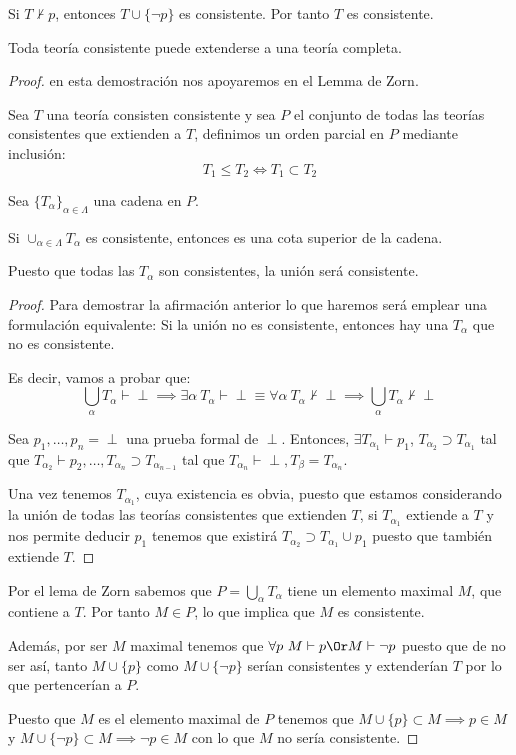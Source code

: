 \documentclass{apuntes}
\begin{document}
\begin{theorem}
	Si $T \nvdash p$, entonces $T\cup \{\neg p\}$ es consistente. Por tanto $T$ es consistente.
	\label{thm:pconsnegp}
\end{theorem}

\begin{theorem}
	Toda teoría consistente puede extenderse a una teoría completa.
	\label{thm:lindenbaum}
\end{theorem}
\begin{proof}
	en esta demostración nos apoyaremos en el Lemma de Zorn. 

	Sea $T$ una teoría consisten consistente y sea $P$ el conjunto de todas las teorías consistentes que extienden a $T$, definimos un orden parcial en $P$ mediante inclusión:
	\[T_1\le T_2 \iff T_1\subset T_2\]

	Sea $\{T_\alpha\}_{\alpha\in\Lambda}$ una cadena en $P$.

	Si $\cup_{\alpha\in\Lambda} T_\alpha$ es consistente, entonces es una cota superior de la cadena. 

	Puesto que todas las $T_\alpha$ son consistentes, la unión será consistente.
	\begin{proof}
	Para demostrar la afirmación anterior lo que haremos será emplear una formulación equivalente: Si la unión no es consistente, entonces hay una $T_α$ que no es consistente.

	Es decir, vamos a probar que:
	\[\bigcup_α T_α \vdash \perp \implies \exists α \ T_α \vdash \perp \equiv \forall α \ T_α \nvdash \perp \implies \bigcup_αT_α \nvdash \perp\]

	Sea $p_1,\hdots,p_n = \perp$ una prueba formal de $\perp$. Entonces, $\exists T_{\alpha_1}\vdash p_1$, $T_{\alpha_2} \supset T_{\alpha_1}$ tal que $T_{\alpha_2}\vdash p_2, \hdots, T_{\alpha_n}\supset T_{\alpha_{n-1}}$ tal que $T_{\alpha_n}\vdash \perp, T_\beta = T_{\alpha_n}$.

	\obs Una vez tenemos $T_{α_1}$, cuya existencia es obvia, puesto que estamos considerando la unión de todas las teorías consistentes que extienden $T$, si $T_{α_1}$ extiende a $T$ y nos permite deducir $p_1$ tenemos que existirá $T_{α_2} \supset T_{α_1} \cup p_1$ puesto que también extiende $T$.
	\end{proof}

	Por el lema de Zorn sabemos que $P=\bigcup_αT_α$ tiene un elemento maximal $M$, que contiene a $T$. Por tanto $M\in P$, lo que implica que $M$ es consistente.

	Además, por ser $M$ maximal tenemos que $\forall p \ M \vdash p \Or M \vdash \neg p$ puesto que de no ser así, tanto $M\cup\{p\}$ como $M\cup\{\neg p\}$ serían consistentes y extenderían $T$ por lo que pertencerían a $P$. 

	Puesto que $M$ es el elemento maximal de $P$ tenemos que $M\cup\{p\} \subset M \implies p \in M$ y $M\cup\{\neg p\}\subset M \implies \neg p \in M$ con lo que $M$ no sería consistente.
\end{proof}
\end{document}
